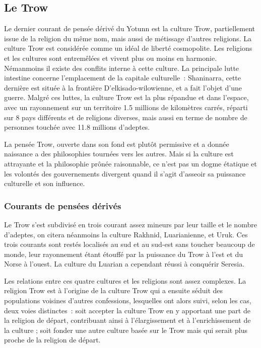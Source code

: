 \documentclass[french, a4paper, 12pt]{article}
\begin{document}
	\subsection{Le Trow}

		Le dernier courant de pensée dérivé du Yotunn est la culture Trow, partiellement issue de la religion du même nom, mais aussi de métissage d'autres religions. La culture Trow est considérée comme un idéal de liberté cosmopolite. Les religions et les cultures sont entremêlées et vivent plus ou moins en harmonie. Némanmoins il existe des conflits interne à cette culture. La principale lutte intestine concerne l'emplacement de la capitale culturelle~: Shaninarra, cette dernière est située à la frontière D'elkisado-wilowienne, et a fait l'objet d'une guerre. Malgré ces luttes, la culture Trow est la plus répandue et dans l'espace, avec un rayonnement sur un territoire 1.5 millions de kilomètres carrés, réparti sur 8 pays différents et de religions diverses, mais aussi en terme de nombre de personnes touchée avec 11.8 millions d'adeptes.

		La pensée Trow, ouverte dans son fond est plutôt permissive et a donnée naissance a des philosophies tournées vers les autres. Mais si la culture est attrayante et la philosophie prônée raisonnable, ce n'est pas un dogme étatique et les volontés des gouvernements divergent quand il s'agit d'asseoir sa puissance culturelle et son influence.

		\subsubsection{Courants de pensées dérivés}

		Le Trow s'est subdivisé en trois courant assez mineurs par leur taille et le nombre d'adeptes, on citera néanmoins la culture Rakhnid, Luarianienne, et Uruk. Ces trois courants sont restés localisés au sud et au sud-est sans toucher beaucoup de monde, leur rayonnement étant étouffé par la puissance du Trow à l'est et du Norse à l'ouest. La culture du Luarian a cependant réussi à conquérir Seresia.

		Les relations entre ces quatre cultures et les religions sont assez complexes. La religion Trow est à l'origine de la culture Trow qui a ensuite séduit des populations voisines d'autres confessions, lesquelles ont alors suivi, selon les cas, deux voies distinctes~: soit accepter la culture Trow en y apportant une part de la religion de départ, contribuant ainsi à l'élargissement et à l'enrichissement de la culture ; soit fonder une autre culture basée sur le Trow mais qui serait plus proche de la religion de départ.
\end{document}
